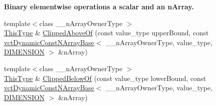 \begin{Indent}{\bf Binary elementwise operations a scalar and an n\-Array.}
\begin{DoxyCompactItemize}
\item 
{\footnotesize template$<$class \-\_\-\-\_\-n\-Array\-Owner\-Type $>$ }\\\hyperlink{classvct_dynamic_const_n_array_base_a5123caffcf1455a1b99003877eade897}{This\-Type} \& \hyperlink{classvct_dynamic_n_array_base_a2ee56f18dc63865f365fc21cbd77e05b}{Clipped\-Above\-Of} (const value\-\_\-type upper\-Bound, const \hyperlink{classvct_dynamic_const_n_array_base}{vct\-Dynamic\-Const\-N\-Array\-Base}$<$ \-\_\-\-\_\-n\-Array\-Owner\-Type, value\-\_\-type, \hyperlink{classvct_dynamic_n_array_base_aa66532d28588bdf26d08fb593db815d6abfcde386ec801b212d7c42d63a4f3837}{D\-I\-M\-E\-N\-S\-I\-O\-N} $>$ \&n\-Array)
\item 
{\footnotesize template$<$class \-\_\-\-\_\-n\-Array\-Owner\-Type $>$ }\\\hyperlink{classvct_dynamic_const_n_array_base_a5123caffcf1455a1b99003877eade897}{This\-Type} \& \hyperlink{classvct_dynamic_n_array_base_a038868f294bb911f8f6e9facd475da23}{Clipped\-Below\-Of} (const value\-\_\-type lower\-Bound, const \hyperlink{classvct_dynamic_const_n_array_base}{vct\-Dynamic\-Const\-N\-Array\-Base}$<$ \-\_\-\-\_\-n\-Array\-Owner\-Type, value\-\_\-type, \hyperlink{classvct_dynamic_n_array_base_aa66532d28588bdf26d08fb593db815d6abfcde386ec801b212d7c42d63a4f3837}{D\-I\-M\-E\-N\-S\-I\-O\-N} $>$ \&n\-Array)
\end{DoxyCompactItemize}
\end{Indent}
